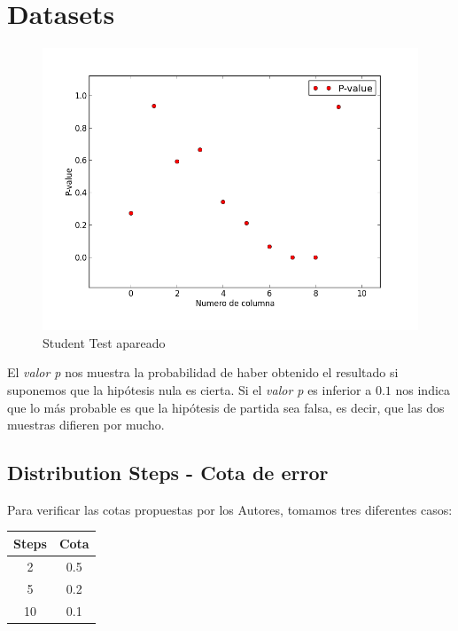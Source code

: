 \documentclass[10pt, a4paper,english,spanish,hidelinks]{article}
\begin{document}
{{\newpage

\section{Datasets}

\begin{figure}
  \centering
  \includegraphics[scale=0.6]{./imagenes/ejc1_p_100.png}
  \caption{Student Test apareado}
\end{figure}


El \textit{valor p} nos muestra la probabilidad de haber obtenido el resultado si suponemos que la hipótesis nula es cierta. Si el \textit{valor p} es inferior a $0.1$ nos indica que lo más probable es que la hipótesis de partida sea falsa, es decir, que las dos muestras difieren por mucho.

\newpage

\subsection{Distribution Steps - Cota de error}

Para verificar las cotas propuestas por los Autores, tomamos tres diferentes casos:


\begin{table}[htdp]
  \begin{center}
    \begin{tabular}{|c|c|} \hline
       Steps & Cota \\ \hline
       2  & 0.5 \\ \hline
       5  & 0.2 \\ \hline
       10 & 0.1 \\ \hline
    \end{tabular}
  \end{center}
\end{table} 


}}
\end{document}
